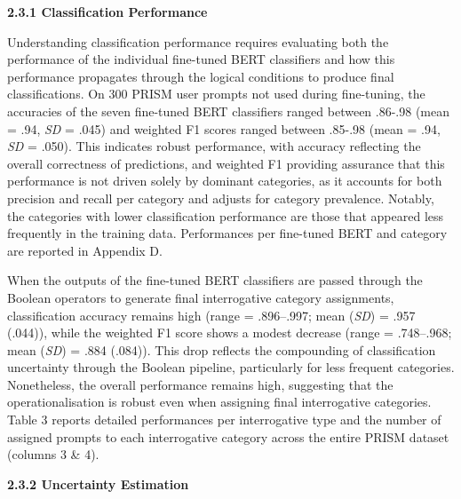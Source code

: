 \documentclass[
  12pt,
]{article}
\begin{document}
\textbf{2.3.1 Classification Performance}

Understanding classification performance requires evaluating both the performance of the individual fine-tuned BERT classifiers and how this performance propagates through the logical conditions to produce final classifications. On 300 PRISM user prompts not used during fine-tuning, the accuracies of the seven fine-tuned BERT classifiers ranged between .86-.98 (mean = .94, \emph{SD} = .045) and weighted F1 scores ranged between .85-.98 (mean = .94, \emph{SD} = .050). This indicates robust performance, with accuracy reflecting the overall correctness of predictions, and weighted F1 providing assurance that this performance is not driven solely by dominant categories, as it accounts for both precision and recall per category and adjusts for category prevalence. Notably, the categories with lower classification performance are those that appeared less frequently in the training data. Performances per fine-tuned BERT and category are reported in Appendix D.

When the outputs of the fine-tuned BERT classifiers are passed through the Boolean operators to generate final interrogative category assignments, classification accuracy remains high (range = .896--.997; mean (\emph{SD}) = .957 (.044)), while the weighted F1 score shows a modest decrease (range = .748--.968; mean (\emph{SD}) = .884 (.084)). This drop reflects the compounding of classification uncertainty through the Boolean pipeline, particularly for less frequent categories. Nonetheless, the overall performance remains high, suggesting that the operationalisation is robust even when assigning final interrogative categories. Table 3 reports detailed performances per interrogative type and the number of assigned prompts to each interrogative category across the entire PRISM dataset (columns 3 \& 4).

\textbf{2.3.2 Uncertainty Estimation}
\end{document}
